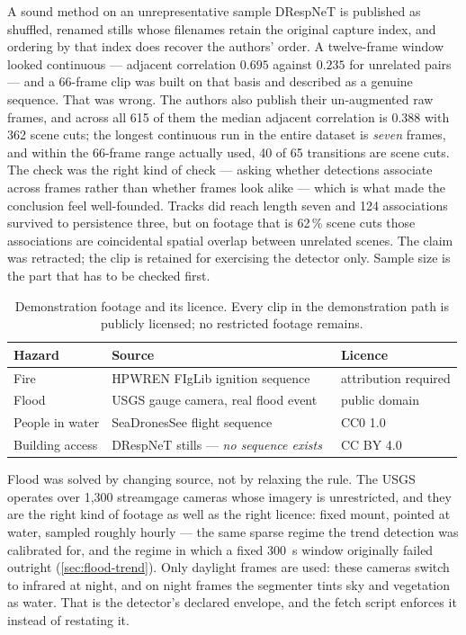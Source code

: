 \begin{recorded}{A sound method on an unrepresentative sample}
DRespNeT is published as shuffled, renamed stills whose filenames retain the
original capture index, and ordering by that index does recover the authors'
order. A twelve-frame window looked continuous — adjacent correlation $0.695$
against $0.235$ for unrelated pairs — and a 66-frame clip was built on that
basis and described as a genuine sequence. That was wrong. The authors also
publish their un-augmented raw frames, and across all 615 of them the median
adjacent correlation is $0.388$ with 362 scene cuts; the longest continuous
run in the entire dataset is \emph{seven} frames, and within the 66-frame
range actually used, 40 of 65 transitions are scene cuts. The check was the
right kind of check — asking whether detections associate across frames rather
than whether frames look alike — which is what made the conclusion feel
well-founded. Tracks did reach length seven and 124 associations survived to
persistence three, but on footage that is 62\,\% scene cuts those associations
are coincidental spatial overlap between unrelated scenes. The claim was
retracted; the clip is retained for exercising the detector only. Sample size
is the part that has to be checked first.
\end{recorded}

\begin{table}[htbp]
\centering\small
\caption{Demonstration footage and its licence. Every clip in the
demonstration path is publicly licensed; no restricted footage remains.}
\label{tab:clips}
\begin{tabularx}{\textwidth}{l L l}
\toprule
Hazard & Source & Licence \\
\midrule
Fire            & HPWREN FIgLib ignition sequence~\citep{hpwren} & attribution required \\
Flood           & USGS gauge camera, real flood event~\citep{usgshivis} & public domain \\
People in water & SeaDronesSee flight sequence~\citep{varga2022seadronessee} & CC0 1.0 \\
Building access & DRespNeT stills — \emph{no sequence exists}~\citep{sirma2025drespnet} & CC BY 4.0 \\
\bottomrule
\end{tabularx}
\end{table}

Flood was solved by changing source, not by relaxing the rule. The USGS
operates over 1{,}300 streamgage cameras whose imagery is unrestricted, and
they are the right kind of footage as well as the right licence: fixed mount,
pointed at water, sampled roughly hourly — the same sparse regime the trend
detection was calibrated for, and the regime in which a fixed
\SI{300}{\second} window originally failed outright (\cref{sec:flood-trend}).
Only daylight frames are used: these cameras switch to infrared at night, and
on night frames the segmenter tints sky and vegetation as water. That is the
detector's declared envelope, and the fetch script enforces it instead of
restating it.

